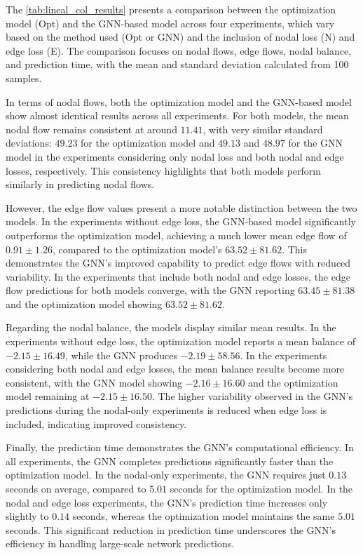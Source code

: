 The \cref{tab:lineal_col_results} presents a comparison between the optimization model (Opt) and the GNN-based model across four experiments, which vary based on the method used (Opt or GNN) and the inclusion of nodal loss (N) and edge loss (E). The comparison focuses on nodal flows, edge flows, nodal balance, and prediction time, with the mean and standard deviation calculated from 100 samples.


In terms of nodal flows, both the optimization model and the GNN-based model show almost identical results across all experiments. For both models, the mean nodal flow remains consistent at around $11.41$, with very similar standard deviations: $49.23$ for the optimization model and $49.13$ and $48.97$ for the GNN model in the experiments considering only nodal loss and both nodal and edge losses, respectively. This consistency highlights that both models perform similarly in predicting nodal flows.


However, the edge flow values present a more notable distinction between the two models. In the experiments without edge loss, the GNN-based model significantly outperforms the optimization model, achieving a much lower mean edge flow of $0.91 \pm 1.26$, compared to the optimization model’s $63.52 \pm 81.62$. This demonstrates the GNN’s improved capability to predict edge flows with reduced variability. In the experiments that include both nodal and edge losses, the edge flow predictions for both models converge, with the GNN reporting $63.45 \pm 81.38$ and the optimization model showing $63.52 \pm 81.62$.



Regarding the nodal balance, the models display similar mean results. In the experiments without edge loss, the optimization model reports a mean balance of $-2.15 \pm 16.49$, while the GNN produces $-2.19 \pm 58.56$. In the experiments considering both nodal and edge losses, the mean balance results become more consistent, with the GNN model showing $-2.16 \pm 16.60$ and the optimization model remaining at $-2.15 \pm 16.50$. The higher variability observed in the GNN’s predictions during the nodal-only experiments is reduced when edge loss is included, indicating improved consistency.

Finally, the prediction time demonstrates the GNN’s computational efficiency. In all experiments, the GNN completes predictions significantly faster than the optimization model. In the nodal-only experiments, the GNN requires just $0.13$ seconds on average, compared to $5.01$ seconds for the optimization model. In the nodal and edge loss experiments, the GNN’s prediction time increases only slightly to $0.14$ seconds, whereas the optimization model maintains the same $5.01$ seconds. This significant reduction in prediction time underscores the GNN’s efficiency in handling large-scale network predictions.

